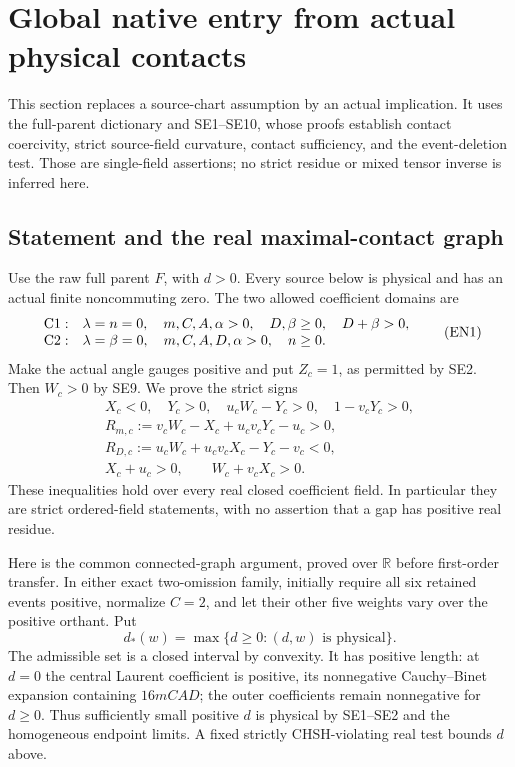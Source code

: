 \section{Global native entry from actual physical contacts}
\label{sec:global-native-entry-rederived}

This section replaces a source-chart assumption by an actual implication.
It uses the full-parent dictionary and SE1--SE10, whose proofs establish
contact coercivity, strict source-field curvature, contact sufficiency,
and the event-deletion test.  Those are single-field assertions; no
strict residue or mixed tensor inverse is inferred here.

\subsection{Statement and the real maximal-contact graph}

Use the raw full parent \(F\), with \(d>0\).
Every source below is physical and has an actual finite noncommuting
zero.  The two allowed coefficient domains are
\[
\begin{array}{ll}
 {\rm C1}:&\lambda=n=0,\quad m,C,A,\alpha>0,\quad
 D,\beta\ge0,\quad D+\beta>0,\\
 {\rm C2}:&\lambda=\beta=0,\quad m,C,A,D,\alpha>0,\quad n\ge0.
\end{array}\tag{EN1}
\]
Make the actual angle gauges positive and put \(Z_c=1\), as permitted
by SE2.  Then \(W_c>0\) by SE9.  We prove the strict signs
\[
\begin{gathered}
 X_c<0,\quad Y_c>0,\quad u_cW_c-Y_c>0,\quad
 1-v_cY_c>0,\\
 R_{m,c}:=v_cW_c-X_c+u_cv_cY_c-u_c>0,\\
 R_{D,c}:=u_cW_c+u_cv_cX_c-Y_c-v_c<0,\\
 X_c+u_c>0,\qquad W_c+v_cX_c>0.
\end{gathered}\tag{EN2}
\]
These inequalities hold over every real closed coefficient field.
In particular they are strict ordered-field statements, with no
assertion that a gap has positive real residue.

Here is the common connected-graph argument, proved over \(\mathbb R\)
before first-order transfer.  In either exact two-omission family,
initially require all six retained events positive, normalize \(C=2\),
and let their other five weights vary over the positive orthant.  Put
\[
 d_*(w)=\max\{d\ge0:(d,w)\text{ is physical}\}.
 \tag{EN3}
\]
The admissible set is a closed interval by convexity.  It has positive
length: at \(d=0\) the central Laurent coefficient is positive, its
nonnegative Cauchy--Binet expansion containing \(16mCAD\); the outer
coefficients remain nonnegative for \(d\ge0\).  Thus sufficiently small
positive \(d\) is physical by SE1--SE2 and the homogeneous endpoint
limits.  A fixed strictly CHSH-violating real test bounds \(d\) above.

